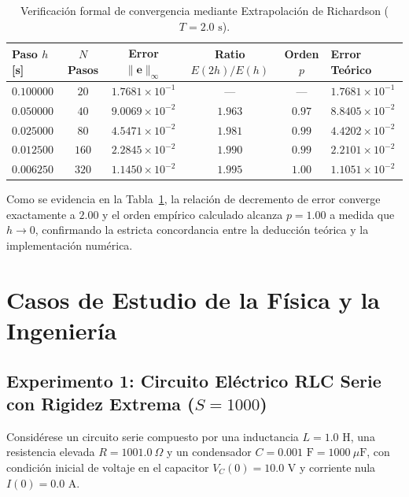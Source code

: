 \documentclass[11pt,a4paper]{article}
\begin{document}
\begin{table}[!htbp]
    \centering
    \caption{Verificación formal de convergencia mediante Extrapolación de Richardson ($T = 2.0\text{ s}$).}
    {\small
    \begin{tabularx}{\linewidth}{>{\centering\arraybackslash}Xcccc>{\centering\arraybackslash}X}
        \toprule
        \textbf{Paso $h$ [s]} & \textbf{$N$ Pasos} & \textbf{Error $\|\mathbf{e}\|_\infty$} & \textbf{Ratio $E(2h)/E(h)$} & \textbf{Orden $p$} & \textbf{Error Teórico} \\
        \midrule
        $0.100000$ & $20$   & $1.7681 \times 10^{-1}$ & ---     & ---   & $1.7681 \times 10^{-1}$ \\
        $0.050000$ & $40$   & $9.0069 \times 10^{-2}$ & $1.963$ & $0.97$ & $8.8405 \times 10^{-2}$ \\
        $0.025000$ & $80$   & $4.5471 \times 10^{-2}$ & $1.981$ & $0.99$ & $4.4202 \times 10^{-2}$ \\
        $0.012500$ & $160$  & $2.2845 \times 10^{-2}$ & $1.990$ & $0.99$ & $2.2101 \times 10^{-2}$ \\
        $0.006250$ & $320$  & $1.1450 \times 10^{-2}$ & $1.995$ & $1.00$ & $1.1051 \times 10^{-2}$ \\
        \bottomrule
    \end{tabularx}
    }
    \label{tab:richardson_formal}
\end{table}

Como se evidencia en la Tabla~\ref{tab:richardson_formal}, la relación de decremento de error converge exactamente a $2.00$ y el orden empírico calculado alcanza $p = 1.00$ a medida que $h \to 0$, confirmando la estricta concordancia entre la deducción teórica y la implementación numérica.

\section{Casos de Estudio de la Física y la Ingeniería}

\subsection{Experimento 1: Circuito Eléctrico RLC Serie con Rigidez Extrema \texorpdfstring{($S = 1000$)}{(S = 1000)}}
Considérese un circuito serie compuesto por una inductancia $L = 1.0\text{ H}$, una resistencia elevada $R = 1001.0\ \Omega$ y un condensador $C = 0.001\text{ F} = 1000\ \mu\text{F}$, con condición inicial de voltaje en el capacitor $V_C(0) = 10.0\text{ V}$ y corriente nula $I(0) = 0.0\text{ A}$.
\end{document}
